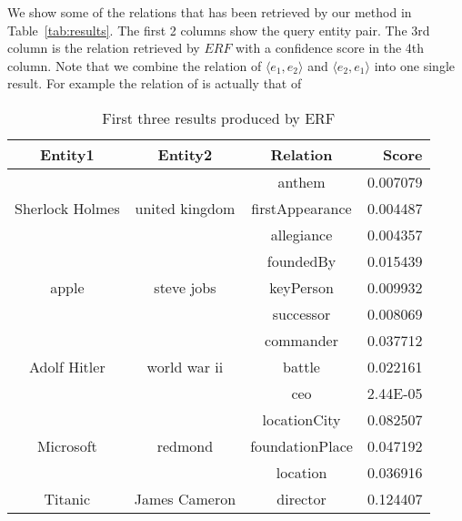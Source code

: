 We show some of the relations that has been retrieved by our method in Table~\ref{tab:results}.
The first 2 columns show the query entity pair.
The 3rd column is the relation retrieved by $ERF$ with a confidence score in the 4th column.
Note that we combine the relation of $\langle e_1,e_2\rangle$ and $\langle e_2,e_1\rangle$ into one single result.
For example the relation  of  is actually that of 
\begin{table}[ht!]
  \centering
  \caption{First three results produced by ERF}
    \begin{tabular}{cccr}
    \toprule
    Entity1 & Entity2 & Relation & Score \\
    \midrule
    \multicolumn{1}{c}{\multirow{3}{*}{\parbox{1cm}{ Sherlock Holmes}}} & \multicolumn{1}{c}{\multirow{3}[0]{*}{united kingdom}} & anthem & 0.007079 \\
    \multicolumn{1}{c}{} & \multicolumn{1}{c}{} & firstAppearance & 0.004487 \\
    \multicolumn{1}{c}{} & \multicolumn{1}{c}{} & allegiance & 0.004357 \\
    \hline
    \multicolumn{1}{c}{\multirow{3}{*}{\parbox{1cm}{\centering apple}}} & \multicolumn{1}{c}{\multirow{3}[0]{*}{steve jobs}} & foundedBy & 0.015439 \\
    \multicolumn{1}{c}{} & \multicolumn{1}{c}{} & keyPerson & 0.009932 \\
    \multicolumn{1}{c}{} & \multicolumn{1}{c}{} & successor & 0.008069 \\
    \hline
    \multicolumn{1}{c}{\multirow{3}{*}{\parbox{1cm}{\centering Adolf Hitler}}} & \multicolumn{1}{c}{\multirow{3}[0]{*}{world war ii}} & commander & 0.037712 \\
    \multicolumn{1}{c}{} & \multicolumn{1}{c}{} & battle & 0.022161 \\
    \multicolumn{1}{c}{} & \multicolumn{1}{c}{} & ceo   & 2.44E-05 \\
    \hline
    \multicolumn{1}{c}{\multirow{3}{*}{\parbox{1cm}{\centering Microsoft}}} & \multicolumn{1}{c}{\multirow{3}[0]{*}{redmond}} & locationCity & 0.082507 \\
    \multicolumn{1}{c}{} & \multicolumn{1}{c}{} & foundationPlace & 0.047192 \\
    \multicolumn{1}{c}{} & \multicolumn{1}{c}{} & location & 0.036916 \\
    \hline
    \multicolumn{1}{c}{\multirow{3}{*}{Titanic}} & \multicolumn{1}{c}{\multirow{3}[0]{*}{James Cameron}} & director & 0.124407 \\

\end{tabular}
\end{table}
